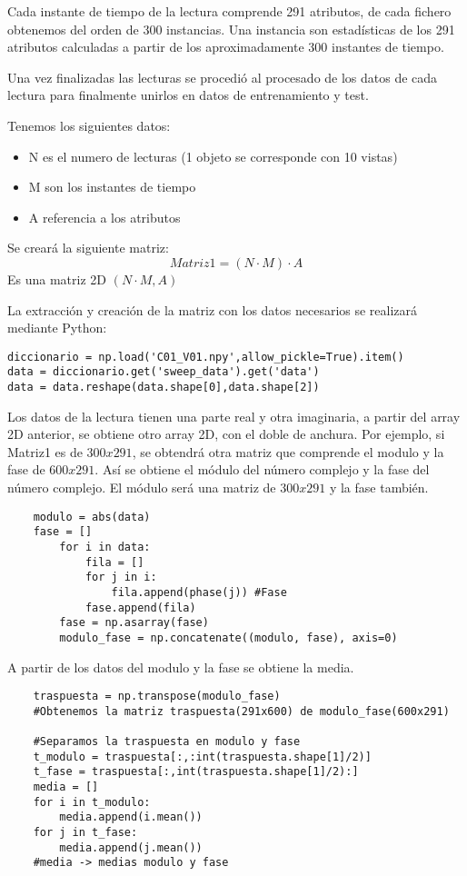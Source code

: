 Cada instante de tiempo de la lectura comprende 291 atributos, de cada fichero obtenemos del orden de 300 instancias. Una instancia son estadísticas de los 291 atributos calculadas a partir de los aproximadamente 300 instantes de tiempo.

Una vez finalizadas las lecturas se procedió al procesado de los datos de cada lectura para finalmente unirlos en datos de entrenamiento y test.

Tenemos los siguientes datos:
\begin{itemize}
\item N es el numero de lecturas (1 objeto se corresponde con 10 vistas)
\item M son los instantes de tiempo
\item A referencia a los atributos
\end{itemize}

Se creará la siguiente matriz:
\begin{equation}
	Matriz1 = (N \cdot M) \cdot A
\end{equation}
Es una matriz 2D $(N \cdot M,A)$

La extracción y creación de la matriz con los datos necesarios se realizará mediante Python:

\begin{verbatim}
diccionario = np.load('C01_V01.npy',allow_pickle=True).item()
data = diccionario.get('sweep_data').get('data')
data = data.reshape(data.shape[0],data.shape[2])
\end{verbatim}

Los datos de la lectura tienen una parte real y otra imaginaria, a partir del array 2D anterior, se obtiene otro array 2D, con el doble de anchura.
Por ejemplo, si Matriz1 es de $ 300 x 291 $, se obtendrá otra matriz que comprende el modulo y la fase de $ 600 x 291 $. Así se obtiene el módulo del número complejo y la fase del número complejo.
El módulo será una matriz de $ 300 x 291 $ y la fase también.

\begin{verbatim}
	modulo = abs(data)
	fase = []
		for i in data:
			fila = []
			for j in i:
				fila.append(phase(j)) #Fase
			fase.append(fila)
   	 	fase = np.asarray(fase)
   	 	modulo_fase = np.concatenate((modulo, fase), axis=0)
\end{verbatim}

A partir de los datos del modulo y la fase se obtiene la media.
\begin{verbatim}
	traspuesta = np.transpose(modulo_fase)
	#Obtenemos la matriz traspuesta(291x600) de modulo_fase(600x291)

	#Separamos la traspuesta en modulo y fase
	t_modulo = traspuesta[:,:int(traspuesta.shape[1]/2)]
	t_fase = traspuesta[:,int(traspuesta.shape[1]/2):]
	media = []
	for i in t_modulo:
    	media.append(i.mean())
	for j in t_fase:
    	media.append(j.mean())
	#media -> medias modulo y fase
\end{verbatim}

